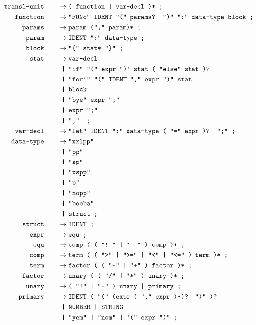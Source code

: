 \documentclass[12pt, a4paper]{article}
\newcommand{\ttt}[1]{
    \text{\texttt{#1}}
}
\newcommand{\ebnfnode}[2]{%
    #1\hspace{20px} &\to #2\ttt{ ;}\\
}
\newcommand{\ebnfnodett}[2]{%
    \ebnfnode{\ttt{#1}}{\ttt{#2}}
}
\begin{document}
    \begin{align*}
        \ebnfnodett{transl-unit}{( function | var-decl )*}
        \ebnfnodett{function}{"FUNc" IDENT "(" params? ")" ":" data-type block}
        \ebnfnodett{params}{param ("," param)*}
        \ebnfnodett{param}{IDENT ":" data-type}
        \ebnfnodett{block}{"\{" stat* "\}"}
        \ebnfnode{\ttt{stat}}
        {%
            \ttt{var-decl}\\
            &\ttt{ | "if" "(" expr ")" stat ( "else" stat )?}\\
            &\ttt{ | "fori" "(" IDENT "," expr ")" stat }\\
            &\ttt{ | block }\\
            &\ttt{ | "bye" expr ";" }\\
            &\ttt{ | expr ";" }\\
            &\ttt{ | ";" }
        }
        \ebnfnodett{var-decl}{"let" IDENT ":" data-type ( "=" expr )? ";"}
        \ebnfnode{\ttt{data-type}}
        {%
            \ttt{"xxlpp"}\\
            &\ttt{ | "pp"}\\
            &\ttt{ | "sp"}\\
            &\ttt{ | "xspp"}\\
            &\ttt{ | "p"}\\
            &\ttt{ | "nopp"}\\
            &\ttt{ | "booba"}\\
            &\ttt{ | struct}
        }
        \ebnfnodett{struct}{IDENT}
        \ebnfnodett{expr}{equ}
        \ebnfnodett{equ}{comp ( ( "!=" | "==" ) comp )*}
        \ebnfnodett{comp}{term ( ( ">" | ">=" | "<" | "<=" ) term )*}
        \ebnfnodett{term}{factor ( ( "-" | "+" ) factor )*}
        \ebnfnodett{factor}{unary ( ( "/" | "*" ) unary )*}
        \ebnfnodett{unary}{( "!" | "-" ) unary | primary}
        \ebnfnode{\ttt{primary}}
        {%
            \ttt{IDENT ( "(" (expr ( "," expr )*)? ")" )?}\\
            &\ttt{ | NUMBER | STRING}\\
            &\ttt{ | "yem" | "nom" | "(" expr ")"}
        }
    \end{align*}
\end{document}
